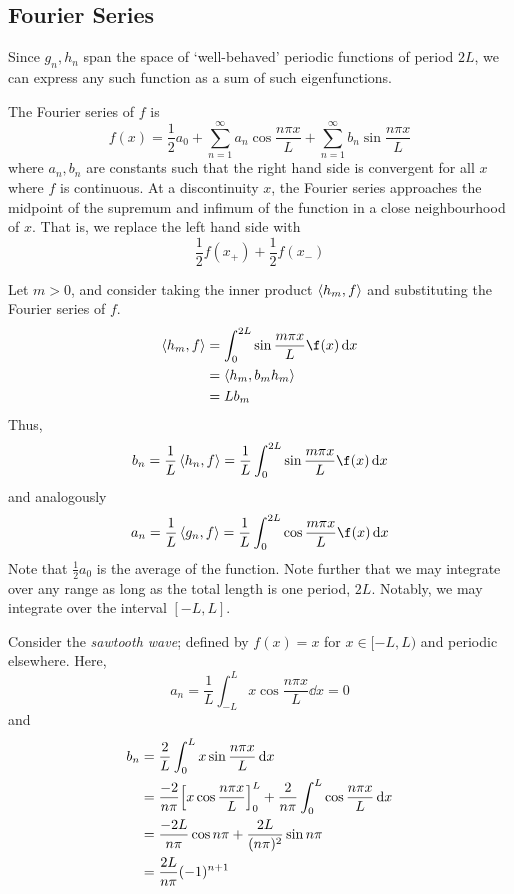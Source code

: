 \subsection{Fourier Series}
Since \( g_n, h_n \) span the space of `well-behaved' periodic functions of period \( 2L \), we can express any such function as a sum of such eigenfunctions.
\begin{definition}
The Fourier series of \( f \) is
\[ f(x) = \frac{1}{2}a_0 + \sum_{n=1}^\infty a_n \cos \frac{n \pi x}{L} + \sum_{n=1}^\infty b_n \sin \frac{n \pi x}{L} \]
where \( a_n, b_n \) are constants such that the right hand side is convergent for all \( x \) where \( f \) is continuous.
At a discontinuity \( x \), the Fourier series approaches the midpoint of the supremum and infimum of the function in a close neighbourhood of \( x \).
That is, we replace the left hand side with
\[ \frac{1}{2}f(x_+) + \frac{1}{2}f(x_-) \]
\end{definition}
\noindent Let \( m > 0 \), and consider taking the inner product \( \left\langle{h_m, f}\right\rangle \) and substituting the Fourier series of \( f \).
\begin{align*}
    \inner{h_m, f} &= \int_0^{2L} \sin\frac{m \pi x}{L} \f(x) \dd{x} \\
    &= \inner{h_m, b_m h_m} \\
    &= L b_m
\end{align*}
Thus,
\[ b_n = \frac{1}{L} \inner{h_n, f} = \frac{1}{L} \int_0^{2L} \sin\frac{m \pi x}{L} \f(x) \dd{x} \]
and analogously
\[ a_n = \frac{1}{L} \inner{g_n, f} = \frac{1}{L} \int_0^{2L} \cos\frac{m \pi x}{L} \f(x) \dd{x} \]
Note that \( \frac{1}{2} a_0 \) is the average of the function.
Note further that we may integrate over any range as long as the total length is one period, \( 2L \).
Notably, we may integrate over the interval \( [-L, L] \).

\begin{example}
    Consider the \textit{sawtooth wave}; defined by \( f(x) = x \) for \( x \in [-L, L) \) and periodic elsewhere.
    Here,
    \[ a_n = \frac{1}{L} \int_{-L}^L x \cos \frac{n\pi x}{L} \dd{x} = 0 \]
    and
    \begin{align*}
        b_n &= \frac{2}{L} \int_0^L x \sin \frac{n\pi x}{L} \dd{x} \\
        &= \frac{-2}{n\pi} \qty[x \cos \frac{n\pi x}{L}]_0^L + \frac{2}{n\pi} \int_0^L \cos \frac{n \pi x}{L} \dd{x} \\
        &= \frac{-2L}{n\pi} \cos n \pi + \frac{2L}{(n\pi)^2} \sin n \pi \\
        &= \frac{2L}{n\pi} (-1)^{n+1}
    \end{align*}
\end{example}
